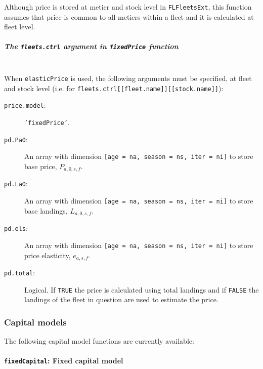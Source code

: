 Although price is stored at metier and stock level in \texttt{FLFleetsExt}, this function assumes that 
price is common to all metiers within a fleet and it is calculated at fleet level. 

\subparagraph{The \texttt{fleets.ctrl} argument in \texttt{fixedPrice} function}
\quad\\	

When \texttt{elasticPrice} is used, 
the following arguments must be specified, at fleet and stock level (i.e. for \texttt{fleets.ctrl[[fleet.name]][[stock.name]]}):

\begin{description}
	\item[\texttt{price.model}:] \texttt{'fixedPrice'}.
	\item[\texttt{pd.Pa0}:] An array with dimension \texttt{[age = na, season = ns, iter = ni]} to store base price,
							$P_{a,0,s,f}$.
	\item[\texttt{pd.La0}:] An array with dimension \texttt{[age = na, season = ns, iter = ni]} to store base landings, 
							$L_{a,0,s,f}$.
	\item[\texttt{pd.els}:] An array with dimension \texttt{[age = na, season = ns, iter = ni]} to store price elasticity,
							 $e_{a,s,f}$.
	\item[\texttt{pd.total}:] Logical. If \texttt{TRUE} the price is calculated using total landings and if 
							\texttt{FALSE} the landings of the fleet in question are used to estimate the price.
\end{description}



\subsubsection{Capital models}

  The following capital model functions are currently available:


\paragraph{\texttt{fixedCapital}: Fixed capital model} \hspace{0pt} \smallskip

